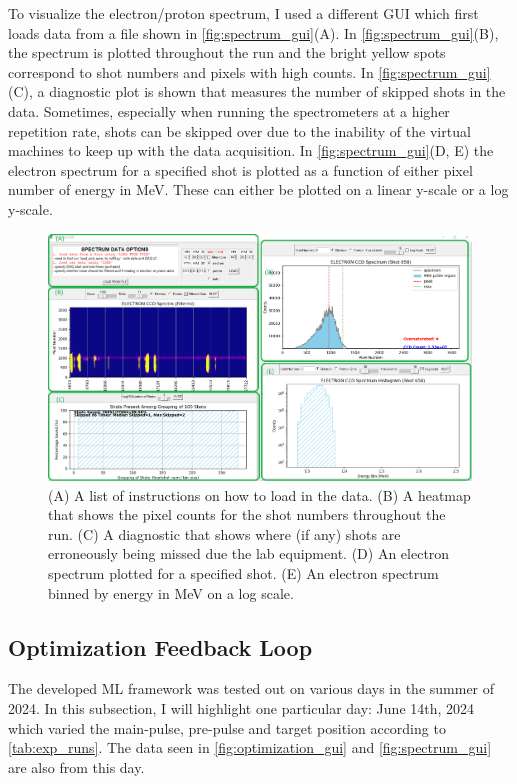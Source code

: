 To visualize the electron/proton spectrum, I used a different \gls{GUI} which first loads data from a file shown in \autoref{fig:spectrum_gui}(A). In \autoref{fig:spectrum_gui}(B), the spectrum is plotted throughout the run and the bright yellow spots correspond to shot numbers and pixels with high counts. In \autoref{fig:spectrum_gui}(C), a diagnostic plot is shown that measures the number of skipped shots in the data. Sometimes, especially when running the spectrometers at a higher repetition rate, shots can be skipped over due to the inability of the virtual machines to keep up with the data acquisition. In \autoref{fig:spectrum_gui}(D, E) the electron spectrum for a specified shot is plotted as a function of either pixel number of energy in MeV. These can either be plotted on a linear y-scale or a log y-scale.

\begin{figure}
	\centering 
	\includegraphics[width=\linewidth]{planning/images/daq/spectrum_gui.png}
	\caption{(A) A list of instructions on how to load in the data. (B) A heatmap that shows the pixel counts for the shot numbers throughout the run. (C) A diagnostic that shows where (if any) shots are erroneously being missed due the lab equipment. (D) An electron spectrum plotted for a specified shot. (E) An electron spectrum binned by energy in MeV on a log scale.}
	\label{fig:spectrum_gui}
\end{figure}

\subsection{Optimization Feedback Loop}
The developed \gls{ML} framework was tested out on various days in the summer of 2024. In this subsection, I will highlight one particular day: June 14th, 2024 which varied the main-pulse, pre-pulse and target position according to \autoref{tab:exp_runs}. The data seen in \autoref{fig:optimization_gui} and \autoref{fig:spectrum_gui} are also from this day. 


